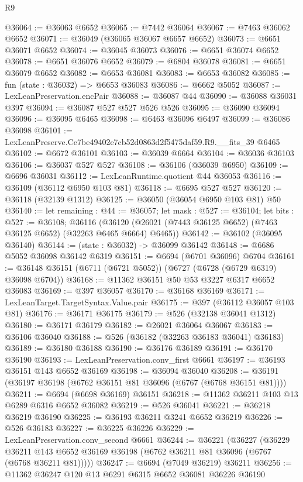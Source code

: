 \begin{lexlean}{R9}
\begin{coremodule}
@36064 := @36063 @6652
@36065 := @7442 @36064
@36067 := @7463 @36062 @6652
@36071 := @36049 (@36065 @36067 @6657 @6652)
@36073 := @6651 @36071 @6652
@36074 := @36045 @36073
@36076 := @6651 @36074 @6652
@36078 := @6651 @36076 @6652
@36079 := @6804 @36078
@36081 := @6651 @36079 @6652
@36082 := @6653 @36081
@36083 := @6653 @36082
@36085 := fun (state : @36032) => @6653 @36083
@36086 := @6662 @5052
@36087 := LexLeanPreservation.encPair
@36088 := @36087 @44
@36090 := @36088 @36031 @397
@36094 := @36087 @527 @527 @526 @526
@36095 := @36090 @36094
@36096 := @36095 @6465
@36098 := @6463 @36096 @6497
@36099 := @36086 @36098
@36101 := LexLeanPreserve.Ce7be49402e7cb52d0863d2f5475daf59.R9.__fits_39 @6465
@36102 := @6672 @36101
@36103 := @36039 @6664
@36104 := @36036 @36103
@36106 := @36037 @527 @527
@36108 := @36106 (@36039 @6950)
@36109 := @6696 @36031
@36112 := LexLeanRuntime.quotient @44 @36053
@36116 := @36109 (@36112 @6950 @103 @81)
@36118 := @6695 @527 @527
@36120 := @36118 (@32139 @1312)
@36125 := @36050 (@36054 @6950 @103 @81) @50
@36140 := let remaining : @44 := @36057;
  let mask : @527 := @36104;
  let bits : @527 := @36108;
  @36116 (@36120 (@26021 (@7443 @36125 @6652) (@7463 @36125 @6652) (@32263 @6465 @6664) @6465))
@36142 := @36102 (@36095 @36140)
@36144 := (state : @36032) -> @36099 @36142
@36148 := @6686 @5052 @36098 @36142 @6319
@36151 := @6694 (@6701 @36096) @6704
@36161 := @36148 @36151 (@6711 (@6721 @5052)) (@6727 (@6728 (@6729 @6319) @36098 @6704))
@36168 := @11362 @36151 @50 @53 @3227 @6317 @6652 @36083
@36169 := @397 @36057
@36170 := @36168 @36169
@36171 := LexLeanTarget.TargetSyntax.Value.pair
@36175 := @397 (@36112 @36057 @103 @81)
@36176 := @36171 @36175
@36179 := @526 (@32138 @36041 @1312)
@36180 := @36171 @36179
@36182 := @26021 @36064 @36067
@36183 := @36106 @36040
@36188 := @526 (@36182 (@32263 @36183 @36041) @36183)
@36189 := @36180 @36188
@36190 := @36176 @36189
@36191 := @36170 @36190
@36193 := LexLeanPreservation.conv_first @6661
@36197 := @36193 @36151 @143 @6652 @36169
@36198 := @36094 @36040
@36208 := @36191 (@36197 @36198 (@6762 @36151 @81 @36096 (@6767 (@6768 @36151 @81))))
@36211 := @6694 (@6698 @36169) @36151
@36218 := @11362 @36211 @103 @13 @6289 @6316 @6652 @36082
@36219 := @526 @36041
@36221 := @36218 @36219 @36190
@36225 := @36193 @36211 @3241 @6652 @36219
@36226 := @526 @36183
@36227 := @36225 @36226
@36229 := LexLeanPreservation.conv_second @6661
@36244 := @36221
    (@36227
      (@36229 @36211 @143 @6652 @36169 @36198 (@6762 @36211 @81 @36096 (@6767 (@6768 @36211 @81)))))
@36247 := @6694 (@7049 @36219) @36211
@36256 := @11362 @36247 @120 @13 @6291 @6315 @6652 @36081 @36226 @36190

\end{coremodule}
\end{lexlean}
